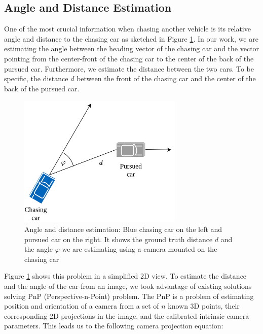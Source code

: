 \documentclass{ctuthesis/ctuthesis}
\begin{document}
\subsection{Angle and Distance Estimation}
One of the most crucial information when chasing another vehicle is its relative angle and distance to the chasing car as sketched in Figure \ref{f:chasing_diagram}. In our work, we are estimating the angle between the heading vector of the chasing car and the vector pointing from the center-front of the chasing car to the center of the back of the pursued car. Furthermore, we estimate the distance between the two cars. To be specific, the distance $d$ between the front of the chasing car and the center of the back of the pursued car. \par


\begin{figure}[]
    \centering
    \includegraphics[width=0.7\textwidth]{images/ChasingDiagram.png}
    
    \caption[Angle and distance estimation 2D overview]{Angle and distance estimation: Blue chasing car on the left and pursued car on the right. It shows the ground truth distance $d$ and the angle $\varphi$ we are estimating using a camera mounted on the chasing car }\label{f:chasing_diagram}
\end{figure}

Figure \ref{f:chasing_diagram} shows this problem in a simplified 2D view. To estimate the distance and the angle of the car from an image, we took advantage of existing solutions solving PnP (Perspective-n-Point) problem. The PnP is a problem of estimating position and orientation of a camera from a set of $n$ known 3D points, their corresponding 2D projections in the image, and the calibrated intrinsic camera parameters. This leads us to the following camera projection equation: \par
\end{document}
